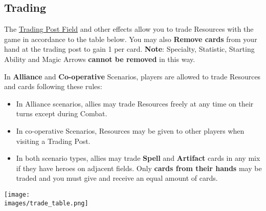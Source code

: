 \subsection*{\hypertarget{Trading}{Trading}}
The \hyperlink{Trading Post}{Trading Post Field} and other effects allow you to trade Resources with the game in accordance to the table below.
You may also \textbf{Remove cards} from your hand at the trading post to gain 1  per card.
\textbf{Note}: Specialty, Statistic, Starting Ability and Magic Arrows \textbf{cannot be removed} in this way.\par
In \textbf{Alliance} and \textbf{Co-operative} Scenarios, players are allowed to trade Resources and cards following these rules:
\begin{itemize}
  \item In Alliance scenarios, allies may trade Resources freely at any time on their turns except during Combat.
  \item In co-operative Scenarios, Resources may be given to other players when visiting a Trading Post.
  \item In both scenario types, allies may trade \textbf{Spell} and \textbf{Artifact} cards in any mix if they have heroes on adjacent fields.
    Only \textbf{cards from their hands} may be traded and you must give and receive an equal amount of cards.
\end{itemize}
\begin{center}
\texttt{[image: \\images/trade\_table.png]}
\end{center}

\clearpage

